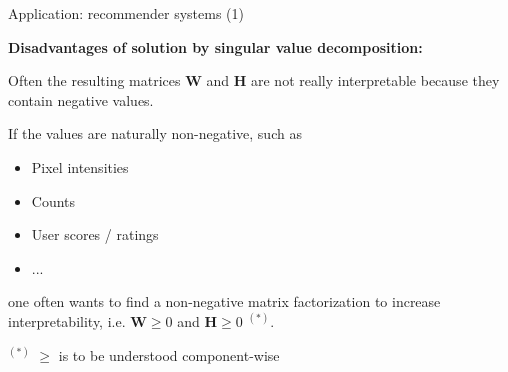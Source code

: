 \begin{vbframe}{Application: recommender systems (1)}
\begin{enumerate}
\end{enumerate}

\framebreak

\textbf{Disadvantages of solution by singular value decomposition:}

\lz

Often the resulting matrices $\mathbf{W}$ and $\mathbf{H}$ are not really interpretable because they contain negative values.

\vspace*{0.2cm}

If the values are naturally non-negative, such as

\begin{itemize}
\item Pixel intensities
\item Counts
\item User scores / ratings
\item ...
\end{itemize}

one often wants to find a non-negative matrix factorization to increase interpretability, i.e. $\mathbf{W}\ge 0$ and $\mathbf{H}\ge 0$ $^{(*)}$.

\vfill

\begin{footnotesize}
 $^{(*)}$ $\ge$ is to be understood component-wise
\end{footnotesize}
\end{vbframe}



\endlecture








